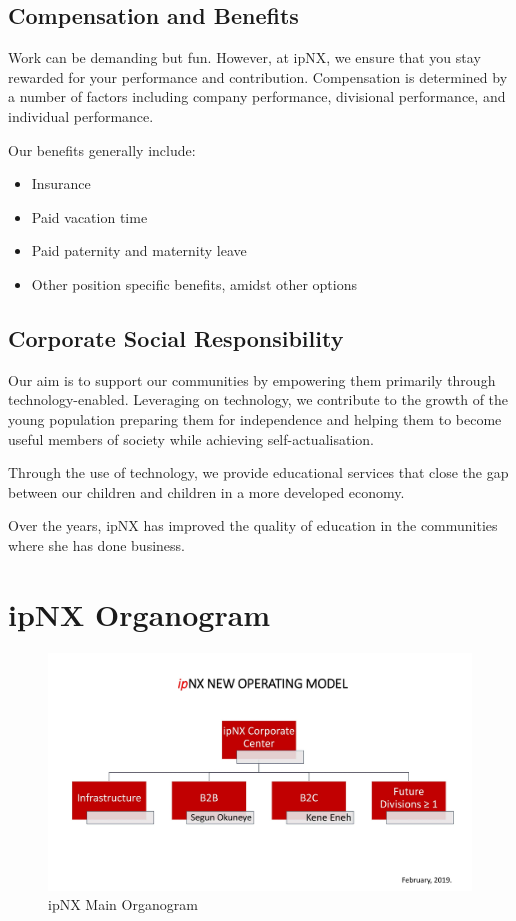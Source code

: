 \subsection{Compensation and Benefits}
Work can be demanding but fun. However, at ipNX, we ensure that you stay rewarded for your performance and contribution. Compensation is determined by a number of factors including company performance, divisional performance, and individual performance.

Our benefits generally include:
\begin{itemize}
	\item Insurance
	\item Paid vacation time
	\item Paid paternity and maternity leave
	\item Other position specific benefits, amidst other options
\end{itemize}
\subsection{Corporate Social Responsibility}
Our aim is to support our communities by empowering them primarily through technology-enabled. Leveraging on technology, we contribute to the growth of the young population preparing them for independence and helping them to become useful members of society while achieving self-actualisation.

Through the use of technology, we provide educational services that close the gap between our children and children in a more developed economy.

Over the years, ipNX has improved the quality of education in the communities where she has done business.

\section{ipNX Organogram}
\begin{figure}[h]
	\centering
	\includegraphics[width=1\textwidth]{./mainorg}
	\caption{ipNX Main Organogram}
\end{figure}

